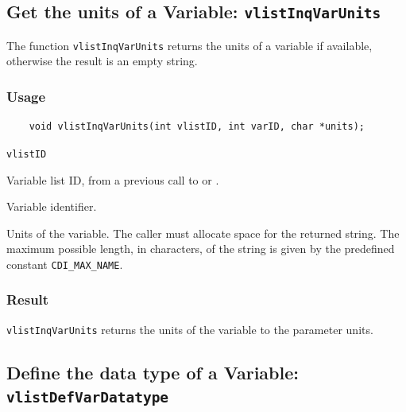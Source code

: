 \subsection{Get the units of a Variable: \texttt{vlistInqVarUnits}}
\label{vlistInqVarUnits}

The function {\texttt{vlistInqVarUnits}} returns the units of a variable if available,
otherwise the result is an empty string.

\subsubsection*{Usage}

\begin{verbatim}
    void vlistInqVarUnits(int vlistID, int varID, char *units);
\end{verbatim}

\hspace*{4mm}\begin{minipage}[]{15cm}
\begin{deflist}{\texttt{vlistID}\ }
\item[\texttt{vlistID}]
Variable list ID, from a previous call to {} or {}.
\item[\texttt{varID}]
Variable identifier.
\item[\texttt{units}]
Units of the variable. The caller must allocate space for the
                    returned string. The maximum possible length, in characters, of
                    the string is given by the predefined constant {\texttt{CDI\_MAX\_NAME}}.

\end{deflist}
\end{minipage}

\subsubsection*{Result}

{\texttt{vlistInqVarUnits}} returns the units of the variable to the parameter units.



\subsection{Define the data type of a Variable: \texttt{vlistDefVarDatatype}}
\label{vlistDefVarDatatype}

